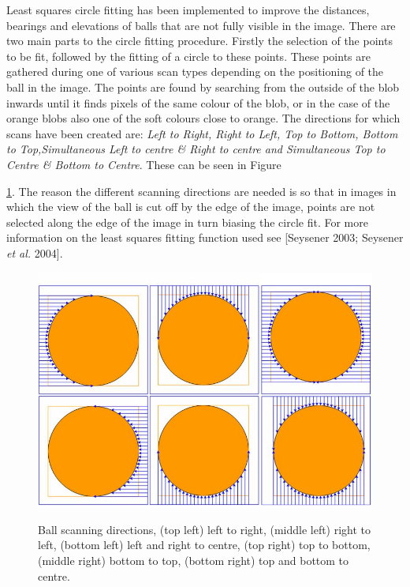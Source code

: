 Least squares circle fitting has been implemented to improve the distances, bearings and elevations of balls that are not fully
visible in the image. There are two main parts to the circle fitting procedure. Firstly the selection of the points to be fit, followed by the fitting of a circle to these points. These points are gathered during one of various scan types depending on the positioning of the ball in the image. The points are found by searching from the outside of the blob inwards until it finds pixels of the same colour of the blob, or in the case of the orange blobs also one of the soft colours close to orange. The directions for which scans have been created are: \emph{Left to Right, Right to Left, Top to Bottom, Bottom to Top,Simultaneous Left to centre \& Right to centre and Simultaneous Top to Centre \& Bottom to Centre}. These can be seen in Figure~{\ref{fig:objectBall3}. The reason the different scanning directions are needed is so that in images in which the view of the ball is cut off by the edge of the image, points are not selected along the edge of the image in turn biasing the circle fit. For more information on the least squares fitting function used see [Seysener 2003; Seysener \emph{et al.} 2004].

\begin{figure}[!ht]
\begin{center}
    \scalebox{0.3} {\includegraphics{stevenfigs/objectBall3.png} }
    \caption{Ball scanning directions,  (top left) left to right, (middle left) right to left, (bottom left) left and right to centre, (top right)  top to bottom, (middle right) bottom to top, (bottom right) top and bottom to centre.}
    \label{fig:objectBall3}
\end{center}
\end{figure}

}
